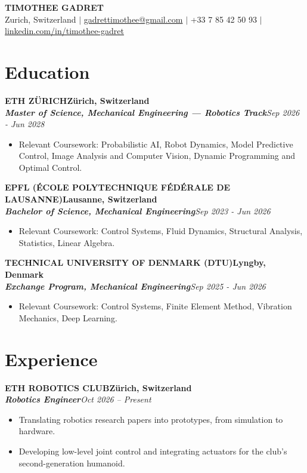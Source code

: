 \documentclass[10pt]{article}
\newcommand{\resumesection}[1]{\section{#1}\vspace{-0.6em}}
\newcommand{\company}[2]{\noindent\textbf{\uppercase{#1}}\hfill \textbf{#2}}
\newcommand{\role}[2]{\textit{\textbf{#1}}\hfill\textit{#2}}
\begin{document}
\begin{center}
    {\LARGE\textbf{TIMOTHEE GADRET}}\\[0.25em]
    \normalsize Zurich, Switzerland $\vert$
    \href{mailto:gadrettimothee@gmail.com}{gadrettimothee@gmail.com} $\vert$
    +33 7 85 42 50 93 $\vert$
    \href{https://linkedin.com/in/timothée-gadret-0282a8333}{linkedin.com/in/timothee-gadret}
\end{center}

\vspace{-1em}

\resumesection{Education}
\company{ETH Zürich}{Zürich, Switzerland}\\
\role{Master of Science, Mechanical Engineering — Robotics Track}{Sep 2026 - Jun 2028}
\begin{itemize}[leftmargin=*,nosep,label={\scriptsize\textbullet}]
    \item Relevant Coursework: Probabilistic AI, Robot Dynamics, Model Predictive Control, Image Analysis and Computer Vision, Dynamic Programming and Optimal Control.
\end{itemize}

\company{EPFL (École Polytechnique Fédérale de Lausanne)}{Lausanne, Switzerland}\\
\role{Bachelor of Science, Mechanical Engineering}{Sep 2023 - Jun 2026}
\begin{itemize}[leftmargin=*,nosep,label={\scriptsize\textbullet}]
    \item Relevant Coursework: Control Systems, Fluid Dynamics, Structural Analysis, Statistics, Linear Algebra.
\end{itemize}

\company{Technical University of Denmark (DTU)}{Lyngby, Denmark}\\
\role{Exchange Program, Mechanical Engineering}{Sep 2025 - Jun 2026}
\begin{itemize}[leftmargin=*,nosep,label={\scriptsize\textbullet}]
    \item Relevant Coursework: Control Systems, Finite Element Method, Vibration Mechanics, Deep Learning.
\end{itemize}

\resumesection{Experience}

\company{ETH Robotics Club}{Zürich, Switzerland}\\
\role{Robotics Engineer}{Oct 2026 – Present}
\begin{itemize}[leftmargin=*,nosep,label={\scriptsize\textbullet}]
    \item Translating robotics research papers into prototypes, from simulation to hardware.
    \item Developing low-level joint control and integrating actuators for the club's second-generation humanoid.
\end{itemize}
\end{document}
